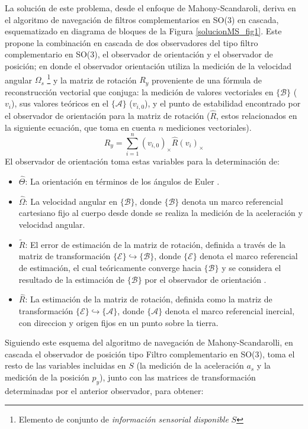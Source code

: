 \documentclass[conference]{IEEEtran}
\newcommand{\marco}[1]{\{\mathcal{#1}\}}
\begin{document}
La solución de este problema, desde el enfoque de Mahony-Scandaroli, deriva en el algoritmo de navegación de filtros complementarios en SO(3) en cascada, esquematizado en diagrama de bloques de la Figura \ref{solucionMS_fig1}. Este propone la combinación en cascada de dos observadores del tipo filtro complementario en SO(3), el observador de orientación y el observador de posición; en donde el observador orientación utiliza la medición de la velocidad angular $\Omega_s$ \footnote{ Elemento de conjunto de \emph{información sensorial disponible} $S$} y la matriz de rotación $R_y$ proveniente de una fórmula de  reconstrucción vectorial que conjuga: la medición de valores vectoriales en $\marco{B}$ ($v_i$), sus valores teóricos en el $\marco{A}$ ($v_{i,0}$), y el punto de estabilidad encontrado por el observador de orientación para la matriz de rotación ($\hat{R}$, estos relacionados en la siguiente ecuación, que toma en cuenta $n$ mediciones vectoriales).
\begin{equation}\label{ReconstruccionVectorial}
R_y=\sum_{i=1}^{n}(v_{i,0})_\times\hat{R}(v_i)_\times
\end{equation}
El observador de orientación toma estas variables para la determinación de: 
\begin{itemize}
\item $\hat{\Theta}$: La orientación en términos de los ángulos de Euler .
\item  $\hat{\Omega}$: La velocidad angular en $\marco{B}$, donde $\marco{B}$ denota un marco referencial cartesiano fijo al cuerpo desde donde se realiza la medición de la aceleración y velocidad angular.
\item $\tilde{R}$: El error de estimación de la matriz de rotación, definida a través de la matriz de transformación $\marco{E}\hookrightarrow\marco{B}$, donde $\marco{E}$ denota el marco referencial de estimación, el cual teóricamente converge hacia $\marco{B}$ y se considera el resultado de la estimación de $\marco{B}$ por el observador de orientación .
\item $\hat{R}$: La estimación de la matriz de rotación, definida como la matriz de transformación $ \marco{E}\hookrightarrow\marco{A}$,  donde $\marco{A}$ denota el marco referencial inercial, con direccion y origen fijos en un punto sobre la tierra.
\end{itemize}
Siguiendo este esquema del algoritmo de navegación de Mahony-Scandarolli, en cascada el observador de posición tipo Filtro complementario en SO(3), toma el resto de las variables incluidas en $S$ (la medición de la aceleración $a_s$ y la medición de la posición $p_y$), junto con las matrices de transformación determinadas por el anterior observador, para obtener:
\end{document}
